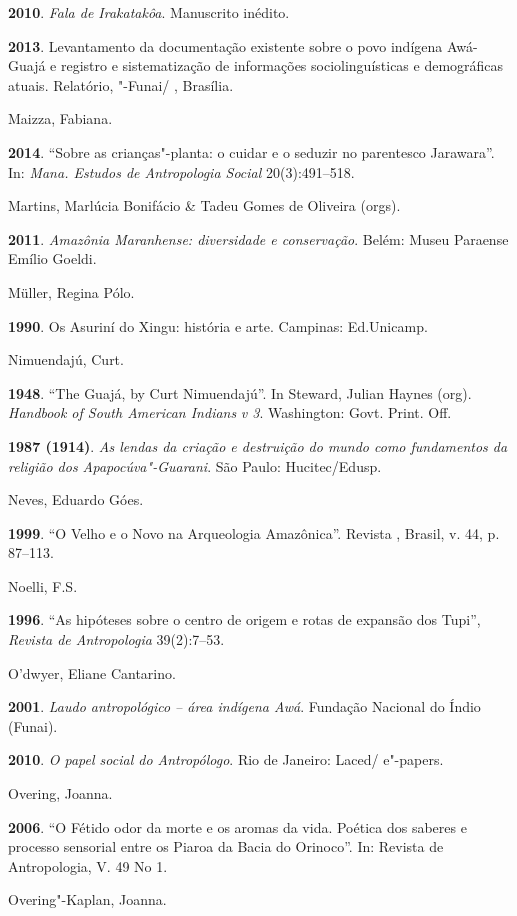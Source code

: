 \begin{Parskip}
\textbf{2010}. \emph{Fala de Irakatakôa}. Manuscrito inédito.

\textbf{2013}. Levantamento da documentação existente sobre o povo
indígena Awá-Guajá e registro e sistematização de informações
sociolinguísticas e demográficas atuais. Relatório, "-Funai/ ,
Brasília.

Maizza, Fabiana.

\textbf{2014}. ``Sobre as crianças"-planta: o cuidar e o seduzir no
parentesco Jarawara''. In: \emph{Mana. Estudos de Antropologia Social}
20(3):491--518.

Martins, Marlúcia Bonifácio \& Tadeu Gomes de Oliveira (orgs).

\textbf{2011}. \emph{Amazônia Maranhense: diversidade e conservação}.
Belém: Museu Paraense Emílio Goeldi.

Müller, Regina Pólo.

\textbf{1990}. Os Asuriní do Xingu: história e arte. Campinas:
Ed.Unicamp.

Nimuendajú, Curt.

\textbf{1948}. ``The Guajá, by Curt Nimuendajú''. In Steward, Julian
Haynes (org). \emph{Handbook of South American Indians} \emph{v 3}.
Washington: Govt. Print. Off.

\textbf{1987 (1914)}. \emph{As lendas da criação e destruição do mundo
como fundamentos da religião dos Apapocúva"-Guarani}. São Paulo:
Hucitec/Edusp.

Neves, Eduardo Góes.

\textbf{1999}. ``O Velho e o Novo na Arqueologia Amazônica''. Revista
, Brasil, v. 44, p. 87--113.

Noelli, F.S.

\textbf{1996}. ``As hipóteses sobre o centro de origem e rotas de
expansão dos Tupi'', \emph{Revista de Antropologia} 39(2):7--53.

O'dwyer, Eliane Cantarino.

\textbf{2001}. \emph{Laudo antropológico -- área indígena Awá}. Fundação
Nacional do Índio (Funai).

\textbf{2010}. \emph{O papel social do Antropólogo}. Rio de Janeiro:
Laced/ e"-papers.

Overing, Joanna.

\textbf{2006}. ``O Fétido odor da morte e os aromas da vida. Poética dos
saberes e processo sensorial entre os Piaroa da Bacia do Orinoco''. In:
Revista de Antropologia, V. 49 No 1.

Overing"-Kaplan, Joanna.


\end{Parskip}
